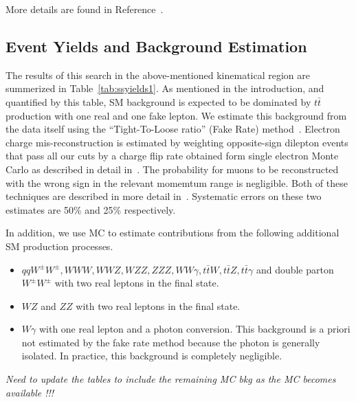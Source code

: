 More details are found in Reference~\cite{ssnote2011}.

\subsection{Event Yields and Background Estimation}
\label{eventsel}

The results of this search in the above-mentioned kinematical region are summerized in Table~\ref{tab:ssyields1}.
As mentioned in the introduction, and quantified by this table, SM background is expected to be dominated by $t\bar{t}$ production
with one real and one fake lepton.
We estimate this background from the data itself using the ``Tight-To-Loose ratio'' (Fake Rate) method~\cite{frmethod}.
Electron charge mis-reconstruction is estimated by weighting opposite-sign dilepton events that pass all our cuts
by a charge flip rate obtained form single electron Monte Carlo as described in detail in~\cite{ssnote2011}.
The probability for muons to be reconstructed with the wrong sign in the relevant momemtum range is negligible.
Both of these techniques are described in more detail in~\cite{ssnote2011}.
Systematic errors on these two estimates are 50\% and 25\% respectively.

In addition, we use MC to estimate contributions from the following additional SM production processes.

\begin{itemize}
\item $qqW^\pm W^\pm, WWW, WWZ, WZZ, ZZZ, WW\gamma, t\bar{t}W, t\bar{t}Z, t\bar{t}\gamma$ and double parton $W^\pm W^\pm$ with two real leptons in the final state.
\item $WZ$ and $ZZ$ with two real leptons in the final state.
\item $W\gamma$ with one real lepton and a photon conversion. This background is a priori not estimated by the fake rate method
because the photon is generally isolated. In practice, this background is completely negligible.
\end{itemize}

{\it Need to update the tables to include the remaining MC bkg as the MC becomes available !!!}

\newcommand{\ttdilS}{\ensuremath{\ttbar\to\ell\ell X}}
\newcommand{\ttslbS}{\ensuremath{\ttbar\to\ell(b\to\ell) X}}
\newcommand{\ttsloS}{\ensuremath{\ttbar\to\ell(b\!\!\!/\to\ell) X}}
\newcommand{\SFnn}{\ensuremath{N^{\rm Wj,raw}_{nn}}}

